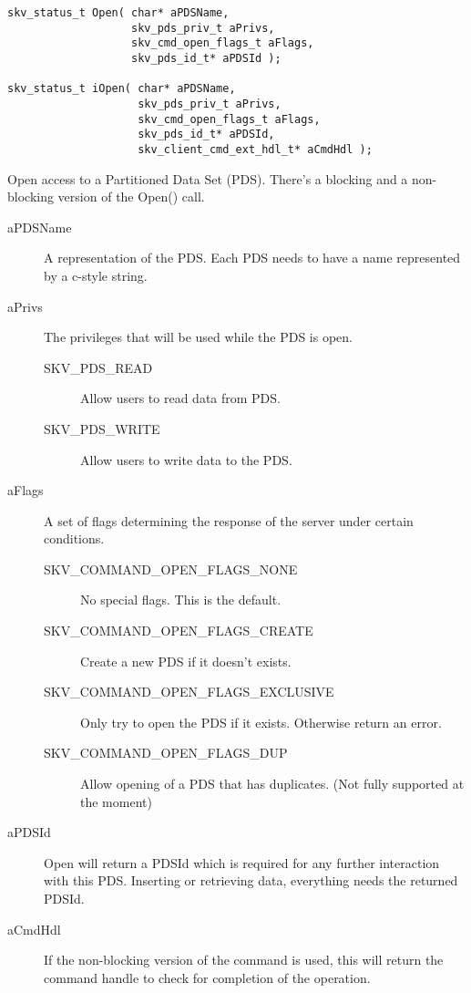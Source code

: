 \begin{lstlisting}
skv_status_t Open( char* aPDSName,
                   skv_pds_priv_t aPrivs,
                   skv_cmd_open_flags_t aFlags,
                   skv_pds_id_t* aPDSId );

skv_status_t iOpen( char* aPDSName,
                    skv_pds_priv_t aPrivs,
                    skv_cmd_open_flags_t aFlags,
                    skv_pds_id_t* aPDSId,
                    skv_client_cmd_ext_hdl_t* aCmdHdl );
\end{lstlisting}

Open access to a Partitioned Data Set (PDS).  There's a blocking and a
non-blocking version of the Open() call.
\begin{description}
\item[aPDSName] A  representation of the PDS.  Each PDS
  needs to have a name represented by a c-style string.

\item[aPrivs] The privileges that will be used while the PDS is open.
  \begin{description}
  \item[\tiny SKV\_PDS\_READ] Allow users to read data from PDS.
  \item[\tiny SKV\_PDS\_WRITE] Allow users to write data to the PDS.
  \end{description}

\item[aFlags] A set of flags determining the response of the server
  under certain conditions.
  \begin{description}
  \item [\tiny SKV\_COMMAND\_OPEN\_FLAGS\_NONE] No special flags. This is
    the default.
  \item[\tiny SKV\_COMMAND\_OPEN\_FLAGS\_CREATE] Create a new PDS if it
    doesn't exists.
  \item[\tiny SKV\_COMMAND\_OPEN\_FLAGS\_EXCLUSIVE] Only try to open the PDS
    if it exists.  Otherwise return an error.
  \item[\tiny SKV\_COMMAND\_OPEN\_FLAGS\_DUP] Allow opening of a PDS that
    has duplicates. (Not fully supported at the moment)
  \end{description}

\item[aPDSId] Open will return a PDSId which is required for any
  further interaction with this PDS.  Inserting or retrieving data,
  everything needs the returned PDSId.

\item[aCmdHdl] If the non-blocking version of the command is used,
  this will return the command handle to check for completion of the
  operation.
\end{description}


